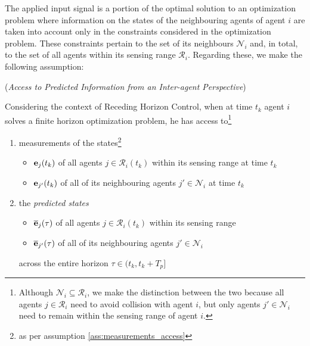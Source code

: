The applied input signal is a portion of the optimal solution to an
optimization problem where information on the states of the neighbouring agents
of agent $i$ are taken into account only in the constraints considered in the
optimization problem. These constraints pertain to the set of its neighbours
$\mathcal{N}_i$ and, in total, to the set of all agents within its sensing
range $\mathcal{R}_i$. Regarding these, we make the following assumption:

\begin{gg_box}
  \begin{assumption} (\textit{Access to Predicted Information from an
    Inter-agent Perspective})

Considering the context of Receding Horizon Control, when
at time $t_k$ agent $i$ solves a finite horizon optimization problem, he has
access to\footnote{Although
  $\mathcal{N}_i \subseteq \mathcal{R}_i$, we make the distinction between
  the two because all agents $j \in \mathcal{R}_i$ need to avoid collision
  with agent $i$, but only agents $j' \in \mathcal{N}_i$ need to remain
  within the sensing range of agent $i$.
}

\begin{enumerate}
  \item measurements of the states\footnote{as per assumption
    \eqref{ass:measurements_access}}
    \begin{itemize}
      \item $\bm{\mathbf{e}}_j(t_k)$ of all agents $j \in \mathcal{R}_i(t_k)$ within its sensing range at time $t_k$
      \item $\bm{\mathbf{e}}_{j'}(t_k)$ of all of its neighbouring agents $j' \in \mathcal{N}_i$ at time $t_k$
      \end{itemize}
    \item the \textit{predicted states}
      \begin{itemize}
        \item $\overline{\bm{\mathbf{e}}}_j(\tau)$ of all agents $j \in \mathcal{R}_i(t_k)$ within its sensing range
        \item $\overline{\bm{\mathbf{e}}}_{j'}(\tau)$ of all of its neighbouring agents $j' \in \mathcal{N}_i$
      \end{itemize}
      across the entire horizon $\tau \in (t_k, t_k + T_p]$
\end{enumerate}
\end{assumption}
\end{gg_box}
